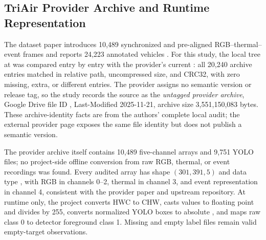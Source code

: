 \documentclass[pdflatex,sn-basic,Numbered,iicol]{sn-jnl}
\begin{document}
\subsection{TriAir Provider Archive and Runtime Representation}
The dataset paper introduces 10,489 synchronized and pre-aligned RGB--thermal--event frames and reports 24,223 annotated vehicles \cite{iaboni2026trimodal}. For this study, the local tree at  was compared entry by entry with the provider's current : all 20,240 archive entries matched in relative path, uncompressed size, and CRC32, with zero missing, extra, or different entries. The provider assigns no semantic version or release tag, so the study records the source as the \emph{untagged provider archive}, Google Drive file ID , Last-Modified 2025-11-21, archive size 3,551,150,083 bytes. These archive-identity facts are from the authors' complete local audit; the external provider page exposes the same file identity but does not publish a semantic version.

The provider archive itself contains 10,489 five-channel  arrays and 9,751 YOLO  files; no project-side offline conversion from raw RGB, thermal, or event recordings was found. Every audited array has shape $(301,391,5)$ and data type , with RGB in channels 0--2, thermal in channel 3, and event representation in channel 4, consistent with the provider paper and upstream repository. At runtime only, the project converts HWC to CHW, casts  values to floating point and divides by 255, converts normalized YOLO boxes to absolute , and maps raw class 0 to detector foreground class 1. Missing and empty label files remain valid empty-target observations.
\end{document}
